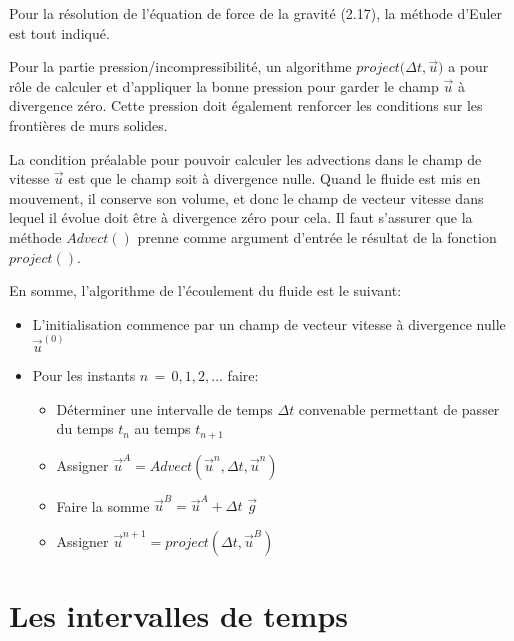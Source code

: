 \documentclass[11pt]{report}
\begin{document}
Pour la résolution de l'équation de force de la gravité (2.17), la méthode d'Euler est tout indiqué.\newline

Pour la partie pression/incompressibilité, un algorithme $ \mathit{project(\Delta t, \overrightarrow{u}}) $  a pour rôle de calculer et d'appliquer la bonne pression pour garder le champ $ \overrightarrow{u} $ à divergence zéro. Cette pression doit 
également renforcer les conditions sur les frontières de murs solides. \newline

La condition préalable pour pouvoir calculer les advections dans le champ de vitesse $  \overrightarrow{u} $ est que le champ soit à divergence nulle. Quand le fluide est mis en mouvement, il conserve son volume, et donc le champ de vecteur vitesse dans lequel il évolue doit être à divergence zéro pour cela. Il faut s'assurer que la méthode $ \mathit{Advect()} $ prenne comme argument d'entrée le résultat de la fonction $ \mathit{project()} $. \newline

En somme, l'algorithme de l'écoulement du fluide est le suivant:

\begin{itemize}
\item L'initialisation commence par un champ de vecteur vitesse à divergence nulle $ \overrightarrow{u}^{(0)} $ 
\item Pour les instants $ n \,=\, 0, 1, 2, ... $ faire:
	\begin{itemize}
		\item Déterminer une intervalle de temps $ \Delta t $ convenable permettant de passer du temps $ t_n $ au temps $ t_{n+1} $
		\item Assigner $ \overrightarrow{u}^A = Advect(\overrightarrow{u}^n, \Delta t, \overrightarrow{u}^n) $
		\item Faire la somme $ \overrightarrow{u}^B = \overrightarrow{u}^A + \Delta t \,\, \overrightarrow{g} $
		\item Assigner $ \overrightarrow{u}^{n+1} = project(\Delta t, \overrightarrow{u}^B) $
	\end{itemize}
\end{itemize}

\section{Les intervalles de temps}
\end{document}
